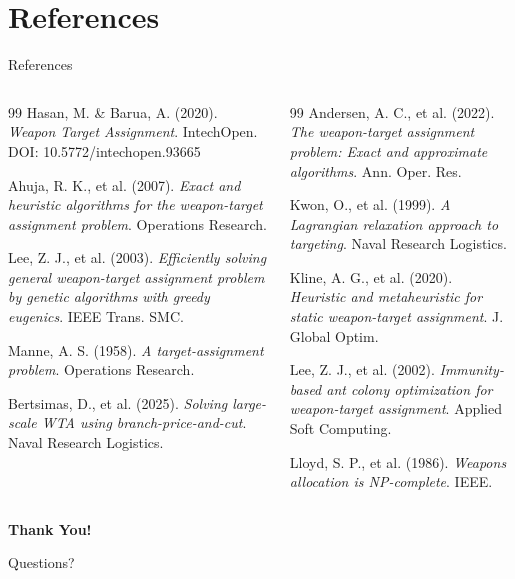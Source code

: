 \documentclass[aspectratio=43,8pt]{beamer}
\begin{document}
\section{References}

\begin{frame}{References}
\begin{columns}[t]
\scriptsize
\begin{thebibliography}{99}
Hasan, M. \& Barua, A. (2020). \textit{Weapon Target Assignment}. IntechOpen. DOI: 10.5772/intechopen.93665

Ahuja, R. K., et al. (2007). \textit{Exact and heuristic algorithms for the weapon-target assignment problem}. Operations Research.

Lee, Z. J., et al. (2003). \textit{Efficiently solving general weapon-target assignment problem by genetic algorithms with greedy eugenics}. IEEE Trans. SMC.

Manne, A. S. (1958). \textit{A target-assignment problem}. Operations Research.

Bertsimas, D., et al. (2025). \textit{Solving large-scale WTA using branch-price-and-cut}. Naval Research Logistics.
\end{thebibliography}

\scriptsize
\begin{thebibliography}{99}
\setcounter{enumiv}{5}
Andersen, A. C., et al. (2022). \textit{The weapon-target assignment problem: Exact and approximate algorithms}. Ann. Oper. Res.

Kwon, O., et al. (1999). \textit{A Lagrangian relaxation approach to targeting}. Naval Research Logistics.

Kline, A. G., et al. (2020). \textit{Heuristic and metaheuristic for static weapon-target assignment}. J. Global Optim.

Lee, Z. J., et al. (2002). \textit{Immunity-based ant colony optimization for weapon-target assignment}. Applied Soft Computing.

Lloyd, S. P., et al. (1986). \textit{Weapons allocation is NP-complete}. IEEE.
\end{thebibliography}
\end{columns}
\end{frame}


\begin{frame}[plain]
\begin{center}
\vspace{2cm}
{\Huge\textbf{\textcolor{primaryblue}{Thank You!}}}

\vspace{1cm}
{\Large Questions?}

\end{center}
\end{frame}
\end{document}
